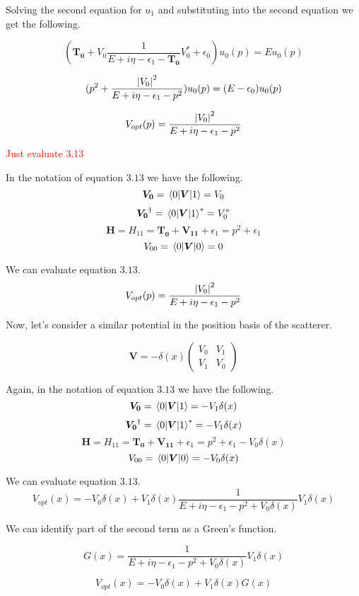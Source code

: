\documentclass[12pt,letterpaper]{article}
\numberwithin{equation}{section}
\newcommand{\beq}{\begin{equation}}
\newcommand{\eeq}{\end{equation}}
\begin{document}
\noindent Solving the second equation for $u_1$ and substituting into the second equation we get the following.

\beq
(\boldsymbol{T_0}+V_{0}\frac{1}{E + i\eta -\epsilon_1-\boldsymbol{T_0}}V_0^*+\epsilon_0)u_0(p)=Eu_0(p)
\eeq

\beq
(p^2+\frac{\abs{V_0}^2}{E + i\eta -\epsilon_1-p^2} )u_0(p)=(E - \epsilon_0)u_0(p)
\eeq

\beq
V_{opt}(p) = \frac{\abs{V_0}^2}{E + i\eta - \epsilon_1 - p^2}
\eeq

\textcolor{red}{Just evaluate 3.13}

\noindent In the notation of equation $3.13$ we have the following.
\beq
\boldsymbol{V_0} = \matrixel{0}{\boldsymbol{V}}{1} = V_0
\eeq
\beq
\boldsymbol{V_0}^\dagger = \matrixel{0}{\boldsymbol{V}}{1}^* = V_0^*
\eeq
\beq
\boldsymbol{H} = H_{11} = \boldsymbol{T_0} + \boldsymbol{V_{11}} + \epsilon_1 = p^2 + \epsilon_1
\eeq
\beq
V_{00} = \matrixel{0}{\boldsymbol{V}}{0} = 0
\eeq

\noindent We can evaluate equation $3.13$.
\beq
V_{opt}(p) = \frac{\abs{V_0}^2}{E + i\eta - \epsilon_1 - p^2}
\eeq

\noindent Now, let's consider a similar potential in the position basis of the scatterer.

\beq
\boldsymbol{V} =
- \delta(x)
\begin{pmatrix}
V_0 & V_1\\ 
V_1 & V_0
\end{pmatrix}
\eeq

\noindent Again, in the notation of equation $3.13$ we have the following.
\beq
\boldsymbol{V_0} = \matrixel{0}{\boldsymbol{V}}{1} = - V_1\delta(x)
\eeq
\beq
\boldsymbol{V_0}^\dagger = \matrixel{0}{\boldsymbol{V}}{1}^* = - V_1\delta(x)
\eeq
\beq
\boldsymbol{H} = H_{11} = \boldsymbol{T_0} + \boldsymbol{V_{11}} + \epsilon_1 = p^2 + \epsilon_1 - V_0\delta(x)
\eeq
\beq
V_{00} = \matrixel{0}{\boldsymbol{V}}{0} = - V_0\delta(x)
\eeq

\noindent We can evaluate equation $3.13$.
\beq
V_{opt}(x) = - V_0\delta(x) + V_1\delta(x) \frac{1}{E + i\eta - \epsilon_1 - p^2 + V_0\delta(x)} V_1\delta(x)
\eeq

\noindent We can identify part of the second term as a Green's function.

\beq
G(x) = \frac{1}{E + i\eta - \epsilon_1 - p^2 + V_0\delta(x)} V_1\delta(x)
\eeq

\beq
V_{opt}(x) = - V_0\delta(x) + V_1\delta(x)G(x)
\eeq
\end{document}
